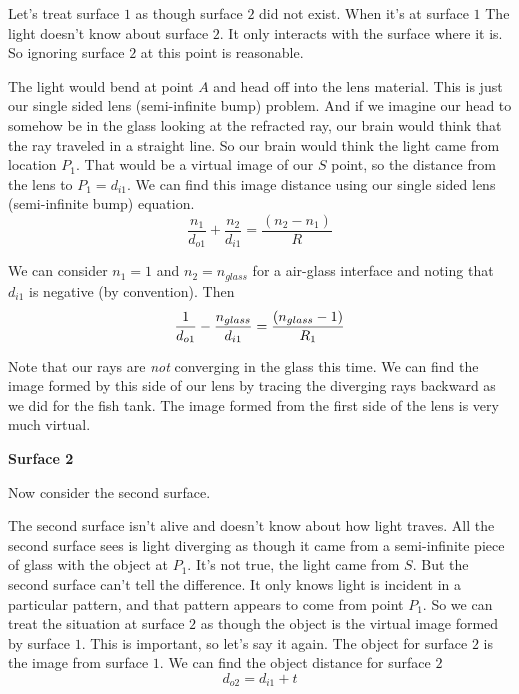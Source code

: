 \documentclass{article}
\begin{document}
Let's treat surface $1$ as though surface $2$ did not exist. When it's at
surface $1$ The light doesn't know about surface $2.$ It only interacts with
the surface where it is. So ignoring surface $2$ at this point is reasonable.

The light would bend at point $A$ and head off into the lens material. This
is just our single sided lens (semi-infinite bump) problem. And if we
imagine our head to somehow be in the glass looking at the refracted ray,
our brain would think that the ray traveled in a straight line. So our brain
would think the light came from location $P_{1}.$ That would be a virtual
image of our $S$ point, so the distance from the lens to $P_{1}=d_{i1}.$ We
can find this image distance using our single sided lens (semi-infinite
bump) equation.%
\[
\frac{n_{1}}{d_{o1}}+\frac{n_{2}}{d_{i1}}=\frac{\left( n_{2}-n_{1}\right) }{R%
}
\]

We can consider $n_{1}=1$ and $n_{2}=n_{glass}$ for a air-glass interface
and noting that $d_{i1}$ is negative (by convention). Then%
\begin{equation}
\frac{1}{d_{o1}}-\frac{n_{glass}}{d_{i1}}=\frac{\left( n_{glass}-1\right) }{%
R_{1}}  \label{Surface1}
\end{equation}

Note that our rays are \emph{not} converging in the glass this time. We can
find the image formed by this side of our lens by tracing the diverging rays
backward as we did for the fish tank. The image formed from the first side
of the lens is very much virtual.

\textbf{Surface 2}

Now consider the second surface.

The second surface isn't alive
and doesn't know about how light traves. All the second surface sees is
light diverging as though it came from a semi-infinite piece of glass with
the object at $P_{1}.$ It's not true, the light came from $S.$ But the
second surface can't tell the difference. It only knows light is incident in
a particular pattern, and that pattern appears to come from point $P_{1}.$
So we can treat the situation at surface $2$ as though the object is the
virtual image formed by surface $1.$ This is important, so let's say it
again. The object for surface $2$ is the image from surface $1.$ We can find
the object distance for surface $2$ 
\[
d_{o2}=d_{i1}+t
\]
\end{document}
